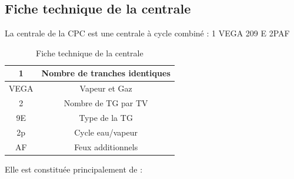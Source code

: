 \subsection{Fiche technique de la centrale}
La centrale de la CPC est une centrale à cycle combiné : 1 VEGA 209 E 2PAF

\begin{table}[h]
\centering
\begin{tabular}{|c|c|}
\hline
1 & Nombre de tranches identiques\\
\hline
VEGA & Vapeur et Gaz\\
\hline
2 & Nombre de TG par TV\\
\hline
9E & Type de la TG\\
\hline
2p & Cycle eau/vapeur\\
\hline
AF & Feux additionnels\\
\hline
\end{tabular}
\caption{Fiche technique de la centrale}
\label{tab:fiche_tech}

\end{table}

Elle est constituée principalement de :

